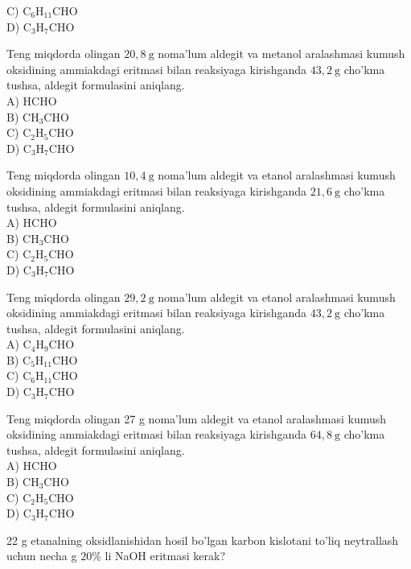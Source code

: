 C) $\mathrm{C}_{6} \mathrm{H}_{11} \mathrm{CHO}$\\
D) $\mathrm{C}_{3} \mathrm{H}_{7} \mathrm{CHO}$
  \item Teng miqdorda olingan $20,8 \mathrm{~g}$ noma'lum aldegit va metanol aralashmasi kumush oksidining ammiakdagi eritmasi bilan reaksiyaga kirishganda $43,2 \mathrm{~g}$ cho'kma tushsa, aldegit formulasini aniqlang.\\
A) HCHO\\
B) $\mathrm{CH}_{3} \mathrm{CHO}$\\
C) $\mathrm{C}_{2} \mathrm{H}_{5} \mathrm{CHO}$\\
D) $\mathrm{C}_{3} \mathrm{H}_{7} \mathrm{CHO}$
  \item Teng miqdorda olingan $10,4 \mathrm{~g}$ noma'lum aldegit va etanol aralashmasi kumush oksidining ammiakdagi eritmasi bilan reaksiyaga kirishganda $21,6 \mathrm{~g}$ cho'kma tushsa, aldegit formulasini aniqlang.\\
A) HCHO\\
B) $\mathrm{CH}_{3} \mathrm{CHO}$\\
C) $\mathrm{C}_{2} \mathrm{H}_{5} \mathrm{CHO}$\\
D) $\mathrm{C}_{3} \mathrm{H}_{7} \mathrm{CHO}$
  \item Teng miqdorda olingan $29,2 \mathrm{~g}$ noma'lum aldegit va etanol aralashmasi kumush oksidining ammiakdagi eritmasi bilan reaksiyaga kirishganda $43,2 \mathrm{~g}$ cho'kma tushsa, aldegit formulasini aniqlang.\\
A) $\mathrm{C}_{4} \mathrm{H}_{9} \mathrm{CHO}$\\
B) $\mathrm{C}_{5} \mathrm{H}_{11} \mathrm{CHO}$\\
C) $\mathrm{C}_{6} \mathrm{H}_{11} \mathrm{CHO}$\\
D) $\mathrm{C}_{3} \mathrm{H}_{7} \mathrm{CHO}$
  \item Teng miqdorda olingan 27 g noma'lum aldegit va etanol aralashmasi kumush oksidining ammiakdagi eritmasi bilan reaksiyaga kirishganda $64,8 \mathrm{~g}$ cho'kma tushsa, aldegit formulasini aniqlang.\\
A) HCHO\\
B) $\mathrm{CH}_{3} \mathrm{CHO}$\\
C) $\mathrm{C}_{2} \mathrm{H}_{5} \mathrm{CHO}$\\
D) $\mathrm{C}_{3} \mathrm{H}_{7} \mathrm{CHO}$
  \item 22 g etanalning oksidlanishidan hosil bo'lgan karbon kislotani to'liq neytrallash uchun necha g $20 \%$ li NaOH eritmasi kerak?\\
